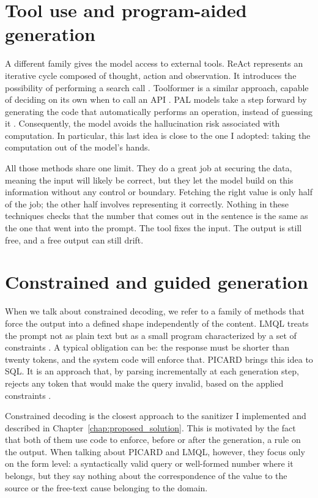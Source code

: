 \documentclass[12pt,a4paper,openright,twoside]{book}
\begin{document}
\section{Tool use and program-aided generation}
A different family gives the model access to external tools. 
\ac{ReAct} represents an iterative cycle composed of thought, action and observation. It introduces the possibility of performing a search call \cite{yao2023react}.
Toolformer is a similar approach, capable of deciding on its own when to call an \ac{API} \cite{schick2023toolformer}.
\ac{PAL} models take a step forward by generating the code that automatically performs an operation, instead of guessing it \cite{gao2023pal}.
Consequently, the model avoids the hallucination risk associated with computation.
In particular, this last idea is close to the one I adopted: taking the computation out of the model’s hands.

All those methods share one limit.
They do a great job at securing the data, meaning the input will likely be correct, but they let the model build on this information without any control or boundary.
Fetching the right value is only half of the job; the other half involves representing it correctly. Nothing in these techniques checks that the number that comes out in the sentence is the same as the one that went into the prompt.
The tool fixes the input. The output is still free, and a free output can still drift.


\section{Constrained and guided generation}
When we talk about constrained decoding, we refer to a family of methods that force the output into a defined shape independently of the content.
\ac{LMQL} treats the prompt not as plain text but as a small program characterized by a set of constraints \cite{beurerkellner2023lmql}. 
A typical obligation can be: the response must be shorter than twenty tokens, and the system code will enforce that.
\ac{PICARD} brings this idea to \ac{SQL}. 
It is an approach that, by parsing incrementally at each generation step, rejects any token that would make the query invalid, based on the applied constraints \cite{scholak2021picard}.

Constrained decoding is the closest approach to the sanitizer I implemented and described in Chapter~\ref{chap:proposed_solution}.
This is motivated by the fact that both of them use code to enforce, before or after the generation, a rule on the output.
When talking about \ac{PICARD} and \ac{LMQL}, however, they focus only on the form level: a syntactically valid query or well-formed number where it belongs, but they say nothing about the correspondence of the value to the source or the free-text cause belonging to the domain.
\end{document}
